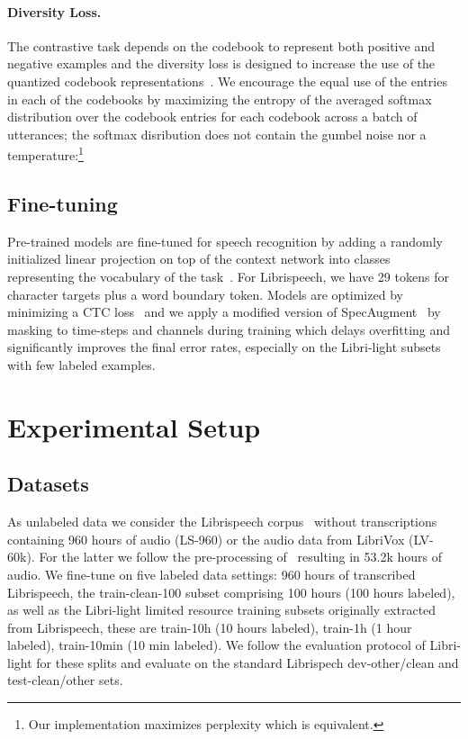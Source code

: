 \documentclass{article}
\newcommand{\vox}{LibriVox}
\newcommand{\libri}{Librispeech}
\newcommand{\libril}{Libri-light}
\newcommand{\voxsz}{LV-60k}
\newcommand{\librisz}{LS-960}
\begin{document}
\paragraph{Diversity Loss.}
The contrastive task depends on the codebook to represent both positive and negative examples and the diversity loss  is designed to increase the use of the quantized codebook representations~\citep{dieleman2018challenge}.
We encourage the equal use of the  entries in each of the  codebooks by maximizing the entropy of the averaged softmax distribution  over the codebook entries for each codebook  across a batch of utterances; the softmax disribution does not contain the gumbel noise nor a temperature:\footnote{Our implementation maximizes perplexity  which is equivalent.}




\subsection{Fine-tuning}
\label{sec:train_finetune}

Pre-trained models are fine-tuned for speech recognition by adding a randomly initialized linear projection on top of the context network into  classes representing the vocabulary of the task~\citep{baevski2019effectiveness}.
For \libri{}, we have 29 tokens for character targets plus a word boundary token. 
Models are optimized by minimizing a CTC loss~\citep{graves2006ctc} and we apply a modified version of SpecAugment~\citep{park2019specaugment} by masking to time-steps and channels during training which delays overfitting and significantly improves the final error rates, especially on the \libril{} subsets with few labeled examples.


\section{Experimental Setup}
\label{sec:setup}

\subsection{Datasets}
\label{sec:setup-datasets}

As unlabeled data we consider the \libri{} corpus~\citep{panayotov2015librispeech} without transcriptions containing 960 hours of audio (\librisz{}) or the audio data from \vox{} (\voxsz{}). 
For the latter we follow the pre-processing of~\citep{kahn2020librilight} resulting in 53.2k hours of audio.
We fine-tune on five labeled data settings: 
960 hours of transcribed \libri{}, the train-clean-100 subset comprising 100 hours (100 hours labeled), as well as the \libril{} limited resource training subsets originally extracted from \libri{}, these are train-10h (10 hours labeled), train-1h (1 hour labeled), train-10min (10 min labeled). 
We follow the evaluation protocol of \libril{} for these splits and evaluate on the standard Librispech dev-other/clean and test-clean/other sets.
\end{document}
